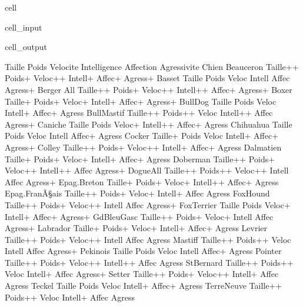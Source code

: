 \documentclass[letterpaper,10pt,french]{sphinxmanual}
\begin{document}
\begin{sphinxuseclass}{cell}
\begin{sphinxuseclass}{cell_input}
\end{sphinxuseclass}
\begin{sphinxuseclass}{cell_output}
\begin{sphinxVerbatim}[commandchars=\\\{\}]
                   Taille    Poids Velocite Intelligence Affection Agressivite
Chien                                                                         
Beauceron        Taille++   Poids+  Veloc++      Intell+    Affec+     Agress+
Basset            Taille\PYGZhy{}   Poids\PYGZhy{}   Veloc\PYGZhy{}      Intell\PYGZhy{}    Affec\PYGZhy{}     Agress+
Berger All       Taille++   Poids+  Veloc++     Intell++    Affec+     Agress+
Boxer             Taille+   Poids+   Veloc+      Intell+    Affec+     Agress+
Bull\PYGZhy{}Dog          Taille\PYGZhy{}   Poids\PYGZhy{}   Veloc\PYGZhy{}      Intell+    Affec+     Agress\PYGZhy{}
Bull\PYGZhy{}Mastif      Taille++  Poids++   Veloc\PYGZhy{}     Intell++    Affec\PYGZhy{}     Agress+
Caniche           Taille\PYGZhy{}   Poids\PYGZhy{}   Veloc+     Intell++    Affec+     Agress\PYGZhy{}
Chihuahua         Taille\PYGZhy{}   Poids\PYGZhy{}   Veloc\PYGZhy{}      Intell\PYGZhy{}    Affec+     Agress\PYGZhy{}
Cocker            Taille+   Poids\PYGZhy{}   Veloc\PYGZhy{}      Intell+    Affec+     Agress+
Colley           Taille++   Poids+  Veloc++      Intell+    Affec+     Agress\PYGZhy{}
Dalmatien         Taille+   Poids+   Veloc+      Intell+    Affec+     Agress\PYGZhy{}
Doberman         Taille++   Poids+  Veloc++     Intell++    Affec\PYGZhy{}     Agress+
Dogue\PYGZhy{}All        Taille++  Poids++  Veloc++      Intell\PYGZhy{}    Affec\PYGZhy{}     Agress+
Epag.\PYGZhy{}Breton      Taille+   Poids+   Veloc+     Intell++    Affec+     Agress\PYGZhy{}
Epag.\PYGZhy{}FranÃ\S{}ais  Taille++   Poids+   Veloc+      Intell+    Affec\PYGZhy{}     Agress\PYGZhy{}
Fox\PYGZhy{}Hound        Taille++   Poids+  Veloc++      Intell\PYGZhy{}    Affec\PYGZhy{}     Agress+
Fox\PYGZhy{}Terrier       Taille\PYGZhy{}   Poids\PYGZhy{}   Veloc+      Intell+    Affec+     Agress+
Gd\PYGZhy{}Bleu\PYGZhy{}Gasc     Taille++   Poids+   Veloc+      Intell\PYGZhy{}    Affec\PYGZhy{}     Agress+
Labrador          Taille+   Poids+   Veloc+      Intell+    Affec+     Agress\PYGZhy{}
Levrier          Taille++   Poids+  Veloc++      Intell\PYGZhy{}    Affec\PYGZhy{}     Agress\PYGZhy{}
Mastiff          Taille++  Poids++   Veloc\PYGZhy{}      Intell\PYGZhy{}    Affec\PYGZhy{}     Agress+
Pekinois          Taille\PYGZhy{}   Poids\PYGZhy{}   Veloc\PYGZhy{}      Intell\PYGZhy{}    Affec+     Agress\PYGZhy{}
Pointer          Taille++   Poids+  Veloc++     Intell++    Affec\PYGZhy{}     Agress\PYGZhy{}
St\PYGZhy{}Bernard       Taille++  Poids++   Veloc\PYGZhy{}      Intell+    Affec\PYGZhy{}     Agress+
Setter           Taille++   Poids+  Veloc++      Intell+    Affec\PYGZhy{}     Agress\PYGZhy{}
Teckel            Taille\PYGZhy{}   Poids\PYGZhy{}   Veloc\PYGZhy{}      Intell+    Affec+     Agress\PYGZhy{}
Terre\PYGZhy{}Neuve      Taille++  Poids++   Veloc\PYGZhy{}      Intell+    Affec\PYGZhy{}     Agress\PYGZhy{}
\end{sphinxVerbatim}


\end{sphinxuseclass}
\end{sphinxuseclass}
\end{document}

